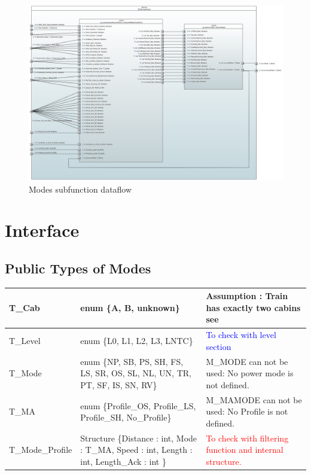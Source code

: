 \begin{landscape}
\begin{figure}[hbtp]
\centering
\includegraphics[scale=0.45]{../SysML/ManageModes.png}
\caption{Modes subfunction dataflow}
\end{figure}
\end{landscape}

\section{Interface}

\subsection{Public Types of Modes}


\begin{center}


\renewcommand{\arraystretch}{2} 
\begin{supertabular}{| m{3cm} | m{6cm} | m{4cm} |}
\hline 
T\_Cab	& enum \{A, B, unknown\}	& Assumption : Train has exactly two cabins see \citep{subset-034} \\ 
\hline
T\_Level & 	enum \{L0, L1, L2, L3, LNTC\}	& \textcolor{blue}{To check with level section}  \\ 
\hline
T\_Mode	& enum \{NP, SB, PS, SH, FS, LS, SR, OS, SL, NL, UN, TR, PT, SF, IS, SN, RV\}	& M\_MODE can not be used: No power mode is not defined. \\ 
\hline
T\_MA	& enum \{Profile\_OS, Profile\_LS, Profile\_SH, No\_Profile\}	& M\_MAMODE can not be used: No Profile is not defined. \\ 
\hline
T\_Mode\_Profile & 	Structure \{Distance : int, Mode :  T\_MA, Speed : int, Length : int, Length\_Ack : int \}	 & \textcolor{red}{To check with filtering function and internal structure.}  \\ 
\hline 
\end{supertabular} 


\end{center}

